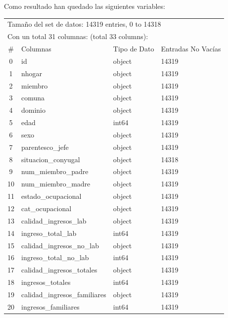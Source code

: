 \documentclass[a4paper]{article}
\begin{document}
    Como resultado han quedado las siguientes variables:
    
    \begin{table}[H]
        \centering
        \begin{tabular}{clll}
            \multicolumn{4}{l}{Tamaño del set de datos: 14319 entries, 0 to 14318} \\
            \multicolumn{4}{l}{Con un total 31 columnas: (total 33 columns):} \\
            \#  & Columnas & Tipo de Dato & Entradas No Vacías \\ \hline
            0   & id & object & 14319 \\ 
            1   & nhogar & object & 14319 \\ 
            2   & miembro & object & 14319 \\ 
            3   & comuna & object & 14319 \\ 
            4   & dominio & object & 14319 \\ 
            5   & edad & int64 & 14319 \\ 
            6   & sexo & object & 14319 \\ 
            7   & parentesco\_jefe & object & 14319 \\ 
            8   & situacion\_conyugal & object & 14318 \\ 
            9   & num\_miembro\_padre & object & 14319 \\ 
            10  & num\_miembro\_madre & object & 14319 \\ 
            11  & estado\_ocupacional & object & 14319 \\ 
            12  & cat\_ocupacional & object & 14319 \\ 
            13  & calidad\_ingresos\_lab & object & 14319 \\ 
            14  & ingreso\_total\_lab & int64 & 14319 \\ 
            15  & calidad\_ingresos\_no\_lab & object & 14319 \\ 
            16  & ingreso\_total\_no\_lab & int64 & 14319 \\ 
            17  & calidad\_ingresos\_totales & object & 14319 \\ 
            18  & ingresos\_totales & int64 & 14319 \\ 
            19  & calidad\_ingresos\_familiares & object & 14319 \\ 
            20  & ingresos\_familiares & int64 & 14319 \\ 

\end{tabular}
\end{table}
\end{document}
